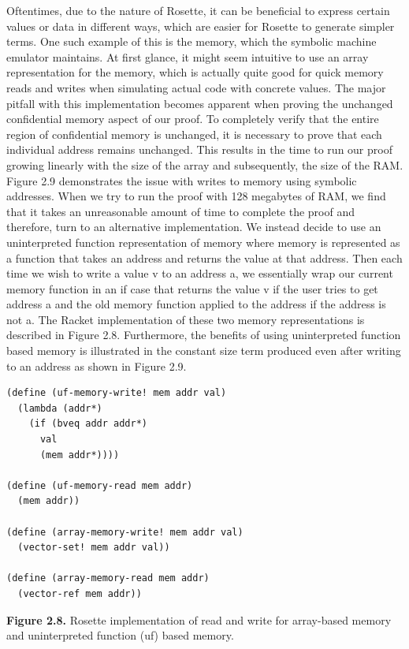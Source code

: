 \documentclass[]{article}
\begin{document}
Oftentimes, due to the nature of Rosette, it can be beneficial to
express certain values or data in different ways, which are easier for
Rosette to generate simpler terms. One such example of this is the
memory, which the symbolic machine emulator maintains. At first glance,
it might seem intuitive to use an array representation for the memory,
which is actually quite good for quick memory reads and writes when
simulating actual code with concrete values. The major pitfall with this
implementation becomes apparent when proving the unchanged confidential
memory aspect of our proof. To completely verify that the entire region
of confidential memory is unchanged, it is necessary to prove that each
individual address remains unchanged. This results in the time to run
our proof growing linearly with the size of the array and subsequently,
the size of the RAM. Figure 2.9 demonstrates the issue with writes to
memory using symbolic addresses. When we try to run the proof with 128
megabytes of RAM, we find that it takes an unreasonable amount of time
to complete the proof and therefore, turn to an alternative
implementation. We instead decide to use an uninterpreted function
representation of memory where memory is represented as a function that
takes an address and returns the value at that address. Then each time
we wish to write a value v to an address a, we essentially wrap our
current memory function in an if case that returns the value v if the
user tries to get address a and the old memory function applied to the
address if the address is not a. The Racket implementation of these two
memory representations is described in Figure 2.8. Furthermore, the
benefits of using uninterpreted function based memory is illustrated in
the constant size term produced even after writing to an address as
shown in Figure 2.9.

\begin{verbatim}
(define (uf-memory-write! mem addr val)
  (lambda (addr*)
    (if (bveq addr addr*)
      val
      (mem addr*))))

(define (uf-memory-read mem addr)
  (mem addr))

(define (array-memory-write! mem addr val)
  (vector-set! mem addr val))

(define (array-memory-read mem addr)
  (vector-ref mem addr))
\end{verbatim}

\textbf{Figure 2.8.} Rosette implementation of read and write for
array-based memory and uninterpreted function (uf) based memory.
\end{document}
